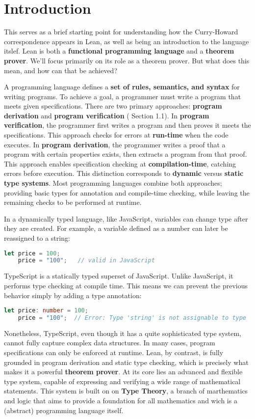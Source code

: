 \section{Introduction}
This serves as a brief starting point for understanding how the Curry-Howard correspondence appears in Lean, 
as well as being an introduction to the language itslef. 
Lean is both a \textbf{functional programming language} and a \textbf{theorem prover}.
We'll focus primarily on its role as a theorem prover. 
But what does this mean, and how can that be achieved?

A programming language defines a \textbf{set of rules, semantics, and syntax} for writing programs. 
To achieve a goal, a programmer must write a program that meets given specifications. 
There are two primary approaches: \textbf{program derivation} and \textbf{program verification} 
( \cite{nordstrom1990programming} Section 1.1).
In \textbf{program verification}, the programmer first writes a program and then proves it meets 
the specifications. This approach checks for errors at \textbf{run-time} when the code executes.
In \textbf{program derivation}, the programmer writes a proof that a program with certain properties exists, 
then extracts a program from that proof. This approach enables specification 
checking at \textbf{compilation-time}, catching errors before execution.
This distinction corresponds to \textbf{dynamic} versus \textbf{static} \textbf{type systems}. 
Most programming languages combine both approaches; providing basic types for annotation and compile-time checking, 
while leaving the remaining checks to be performed at runtime.
\begin{example}
    In a dynamically typed language, like JavaScript, variables can change type after 
    they are created. For example, a variable defined as a number can later 
    be reassigned to a string:
    \begin{lstlisting}[language=JavaScript]
    let price = 100;
    price = "100";   // valid in JavaScript
    \end{lstlisting}
    TypeScript is a statically typed superset of JavaScript.  
    Unlike JavaScript, it performs type checking at compile time.  
    This means we can prevent the previous behavior simply by adding 
    a type annotation:
    \begin{lstlisting}[language=TypeScript]
    let price: number = 100;
    price = "100";  // Error: Type 'string' is not assignable to type 'number'
    \end{lstlisting} 
\end{example}
Nonetheless, TypeScript, even though it has a quite sophisticated type system, cannot fully 
capture complex data structures. In many cases, program specifications can 
only be enforced at runtime.  
Lean, by contrast, is fully grounded in program derivation and static type checking, 
which is precisely what makes it a powerful \textbf{theorem prover}.  
At its core lies an advanced and flexible type system, capable of expressing 
and verifying a wide range of mathematical statements.  
This system is built on on \textbf{Type Theory}, a branch of marthematics and logic 
that aims to provide a foundation for all mathematics and wich is a (abstract) 
programming language itself.

